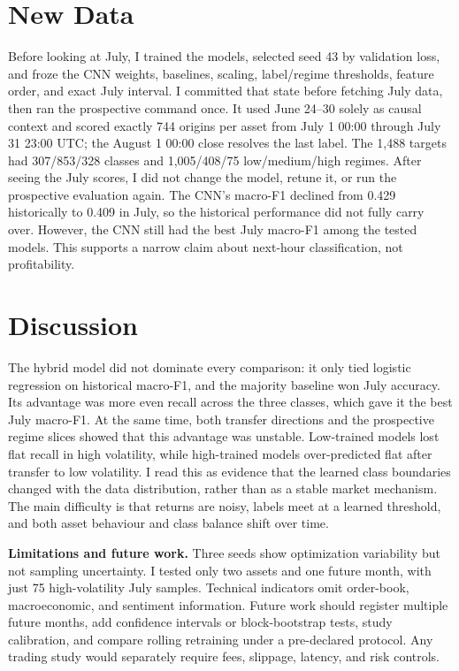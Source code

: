 \documentclass[final]{article}
\newcommand{\tighthead}[1]{\vspace{0.25em}\noindent\textbf{#1}}
\begin{document}
\section{New Data}
Before looking at July, I trained the models, selected seed 43 by validation loss, and froze the CNN
weights, baselines, scaling, label/regime thresholds, feature order, and exact July interval. I committed
that state before fetching July data, then ran the prospective command once. It used
June 24--30 solely as causal context and scored exactly 744 origins per asset from July 1 00:00
through July 31 23:00 UTC; the August 1 00:00 close resolves the last label. The 1,488 targets had
307/853/328 classes and 1,005/408/75 low/medium/high regimes. After seeing the July scores, I did not
change the model, retune it, or run the prospective evaluation again. The CNN's macro-F1 declined from
0.429 historically to 0.409 in July, so the historical performance did not fully carry over. However, the CNN still
had the best July macro-F1 among the tested models. This supports a narrow claim about next-hour
classification, not profitability.

\section{Discussion}
The hybrid model did not dominate every comparison: it only tied logistic regression on historical
macro-F1, and the majority baseline won July accuracy. Its advantage was more even recall across the
three classes, which gave it the best July macro-F1. At the same time, both transfer directions and the
prospective regime slices showed that this advantage was unstable. Low-trained models lost flat recall
in high volatility, while high-trained models over-predicted flat after transfer to low volatility. I read
this as evidence that the learned class boundaries changed with the data distribution, rather than as a
stable market mechanism. The main difficulty is that returns are noisy, labels meet at a learned
threshold, and both asset behaviour and class balance shift over time.

\tighthead{Limitations and future work.} Three seeds show optimization variability but not sampling
uncertainty. I tested only two assets and one future month, with just 75 high-volatility
July samples. Technical indicators omit order-book, macroeconomic, and sentiment information.
Future work should register multiple future months, add confidence intervals or block-bootstrap tests,
study calibration, and compare rolling retraining under a pre-declared protocol. Any trading study
would separately require fees, slippage, latency, and risk controls.
\end{document}
